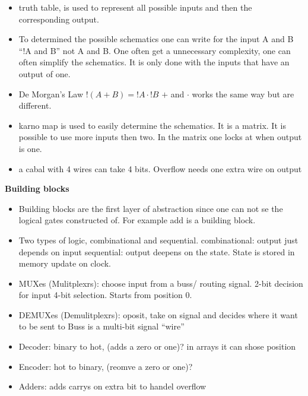\documentclass{article}
\begin{document}
\begin{itemize}
\item  truth table, is used to represent all possible inputs and then the corresponding output.
\item  To determined the possible schematics one can write for the input A and B ``!A and B''
  not A and B. One often get a unnecessary complexity, one can often simplify the schematics.
  It is only done with the inputs that have an output of one.
\item  De Morgan’s Law $!(A+B)=!A \cdot !B$ $+$ and $\cdot$ works the same way but are different.
\item  karno map is used to easily determine the schematics. It is a matrix. It is possible to use
  more inputs then two. In the matrix one locks at when output is one.
\item  a cabal with 4 wires can take 4 bits. Overflow needs one extra wire on output
\end{itemize}


\textbf{Building blocks}
\begin{itemize}
\item   Building blocks are the first layer of abstraction since one can not se the logical gates
  constructed of. For example add is a building block.
\item  Two types of logic, combinational and sequential.
  combinational: output just depends on input
  sequential: output deepens on the state. State is stored in memory update on clock.
\end{itemize}

\begin{itemize}
\item  MUXes (Mulitplexrs): choose input from a buss/ routing signal.
  2-bit decision for input 4-bit selection. Starts from position 0.
\item  DEMUXes (Demulitplexrs): oposit, take on signal and decides where it want to be sent to
  Buss is a multi-bit signal ``wire''
\item  Decoder: binary to hot, (adds a zero or one)? in arrays it can shose position
\item  Encoder: hot to binary, (reomve a zero or one)?
\item  Adders: adds carrys on extra bit to handel overflow
\end{itemize}
\end{document}
